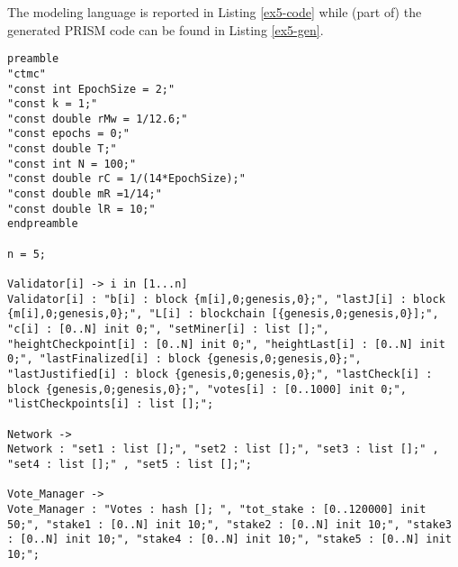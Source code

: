 The modeling language is reported in Listing \ref{ex5-code} while (part of) the generated PRISM code can be found in Listing \ref{ex5-gen}.
\begin{lstlisting}[style=chor-color,caption={Choreographic language for the Hybrid Casper Protocol.},captionpos=b,label={ex5-code}]
preamble
"ctmc"
"const int EpochSize = 2;"
"const k = 1;"
"const double rMw = 1/12.6;"
"const epochs = 0;"
"const double T;"
"const int N = 100;"
"const double rC = 1/(14*EpochSize);"
"const double mR =1/14;"
"const double lR = 10;"
endpreamble
	
n = 5;
	
Validator[i] -> i in [1...n]
Validator[i] : "b[i] : block {m[i],0;genesis,0};", "lastJ[i] : block {m[i],0;genesis,0};", "L[i] : blockchain [{genesis,0;genesis,0}];", "c[i] : [0..N] init 0;", "setMiner[i] : list [];", "heightCheckpoint[i] : [0..N] init 0;", "heightLast[i] : [0..N] init 0;", "lastFinalized[i] : block {genesis,0;genesis,0};", "lastJustified[i] : block {genesis,0;genesis,0};", "lastCheck[i] : block {genesis,0;genesis,0};", "votes[i] : [0..1000] init 0;", "listCheckpoints[i] : list [];";
	
Network ->
Network : "set1 : list [];", "set2 : list [];", "set3 : list [];" , "set4 : list [];" , "set5 : list [];";
		
Vote_Manager -> 
Vote_Manager : "Votes : hash []; ", "tot_stake : [0..120000] init 50;", "stake1 : [0..N] init 10;", "stake2 : [0..N] init 10;", "stake3 : [0..N] init 10;", "stake4 : [0..N] init 10;", "stake5 : [0..N] init 10;";
	

\end{lstlisting}
